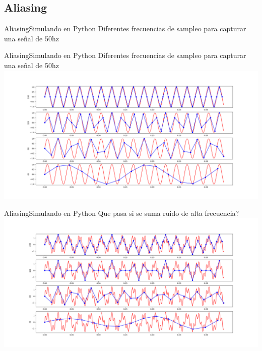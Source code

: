  \subsection{Aliasing}
 \begin{frame}{Aliasing}{Simulando en Python}
    \handsonicon
    Diferentes frecuencias de sampleo para capturar una señal de 50hz
    
    \vfill
 \end{frame}
 \begin{frame}{Aliasing}{Simulando en Python}
    Diferentes frecuencias de sampleo para capturar una señal de 50hz
    \center\includegraphics[width=1.0\textwidth]{1_clase/teorema_sampleo}
    \vfill
 \end{frame}
 \begin{frame}{Aliasing}{Simulando en Python}
    Que pasa si se suma ruido de alta frecuencia?
    \center\includegraphics[width=1.0\textwidth]{1_clase/teorema_sampleo2}
    \vfill
 \end{frame}
